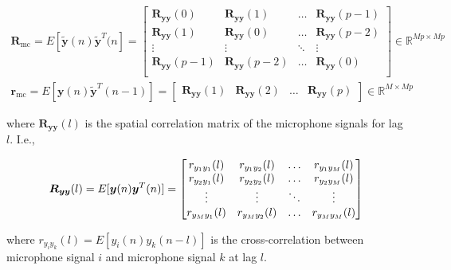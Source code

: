 \begin{eqnarray}
	\boldsymbol{R}_{\mathrm{mc}} = E[\boldsymbol{\tilde{y}}(n) \boldsymbol{\tilde{y}}^T(n] = 
	\begin{bmatrix}
		\boldsymbol{R}_{\boldsymbol{yy}}(0)     & \boldsymbol{R}_{\boldsymbol{yy}}(1)    & \dots   & \boldsymbol{R}_{\boldsymbol{yy}}(p-1)  \\
		\boldsymbol{R}_{\boldsymbol{yy}}(1)      & \boldsymbol{R}_{\boldsymbol{yy}}(0)      & \dots   & \boldsymbol{R}_{\boldsymbol{yy}}(p-2) \\
		\vdots                               & \vdots                               & \ddots & \vdots \\
		\boldsymbol{R}_{\boldsymbol{yy}}(p-1) & \boldsymbol{R}_{\boldsymbol{yy}}(p-2)  & \dots   & \boldsymbol{R}_{\boldsymbol{yy}}(0) \\
	\end{bmatrix}  \in  \mathbb{R} ^ {Mp \times Mp} \\
	\boldsymbol{r}_{\mathrm{mc}} = E[\boldsymbol{y}(n)\boldsymbol{\tilde{y}}^T(n-1)] = 
	\begin{bmatrix}
		\boldsymbol{R}_{\boldsymbol{yy}}(1)     & \boldsymbol{R}_{\boldsymbol{yy}}(2)     & \dots   & \boldsymbol{R}_{\boldsymbol{yy}}(p) 
	\end{bmatrix} \in  \mathbb{R} ^ {M \times Mp}
\end{eqnarray}

\noindent
where $\boldsymbol{R}_{\boldsymbol{yy}}(l)$ is the spatial correlation matrix of the microphone signals for lag $l$. I.e., 

\noindent
\begin{equation}
	\boldsymbol{R}_{\boldsymbol{yy}}(l) = E[\boldsymbol{y}(n) \boldsymbol{y}^T(n)] = 
	\begin{bmatrix} 
		r_{y_1y_1}(l)   & r_{y_1y_2}(l)  & \dots   & r_{y_1y_M}(l) \\
		r_{y_2y_1}(l)   & r_{y_2y_2}(l)& \dots    & r_{y_2y_M}(l)  \\
		\vdots     & \vdots      & \ddots  & \vdots  \\
		r_{y_My_1}(l)  & r_{y_My_2}(l) & \dots    & r_{y_My_M}(l) \\
	\end{bmatrix} \\
\end{equation}

\noindent
where $r_{y_i y_k}(l)=E[y_i(n) y_k(n-l)]$ is the cross-correlation between microphone signal $i$ and microphone signal $k$ at lag $l$. 

